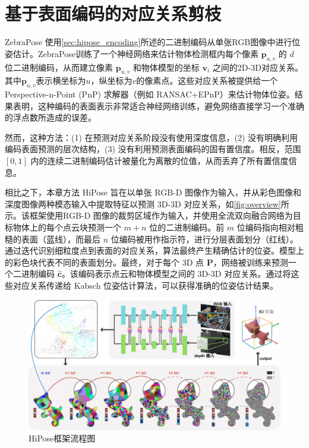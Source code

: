 \section{基于表面编码的对应关系剪枝}

ZebraPose\cite{su2022zebrapose} 使用\autoref{sec:hipose_encoding}所述的二进制编码从单张RGB图像中进行位姿估计。ZebraPose训练了一个神经网络来估计物体检测框内每个像素 $\bm{p}_{u,v}$ 的 $d$ 位二进制编码，从而建立像素 $\bm{p}_{u,v}$ 和物体模型的坐标 $\bm{v}_{i}$ 之间的2D-3D对应关系。其中$\bm{p}_{u,v}$表示横坐标为$u$，纵坐标为$v$的像素点。这些对应关系被提供给一个Perspective-n-Point (PnP) 求解器（例如 RANSAC+EPnP\cite{EPnP}）来估计物体位姿。结果表明，这种编码的表面表示非常适合神经网络训练，避免网络直接学习一个准确的浮点数所造成的误差。

然而，这种方法：(1) 在预测对应关系阶段没有使用深度信息，(2) 没有明确利用编码表面预测的层次结构，(3) 没有利用预测表面编码的固有置信度。相反，范围 $[0,1]$ 内的连续二进制编码估计被量化为离散的位值，从而丢弃了所有置信度信息。

相比之下，本章方法 HiPose 旨在以单张 RGB-D 图像作为输入，并从彩色图像和深度图像两种模态输入中提取特征以预测 3D-3D 对应关系，如\autoref{fig:overview}所示。该框架使用RGB-D 图像的裁剪区域作为输入，并使用全流双向融合网络为目标物体上的每个点云块预测一个 $m+n$ 位的二进制编码。前 $m$ 位编码指向相对粗糙的表面（蓝线），而最后 $n$ 位编码被用作指示符，进行分层表面划分（红线）。通过迭代识别细粒度点到表面的对应关系，算法最终产生精确估计的位姿。模型上的彩色块代表不同的表面划分。最终，对于每个 3D 点 $\bm{P}$，网络被训练来预测一个二进制编码 $\hat{\bm{c}}$。该编码表示点云和物体模型之间的 3D-3D 对应关系。通过将这些对应关系传递给 Kabsch 位姿估计算法\cite{umeyama1991least}，可以获得准确的位姿估计结果。

\begin{figure}[ht]
    \centering
    \includegraphics[width=\textwidth]{figure/hipose/overview.pdf}
    \caption{HiPose框架流程图}
    \label{fig:overview}
\end{figure}

